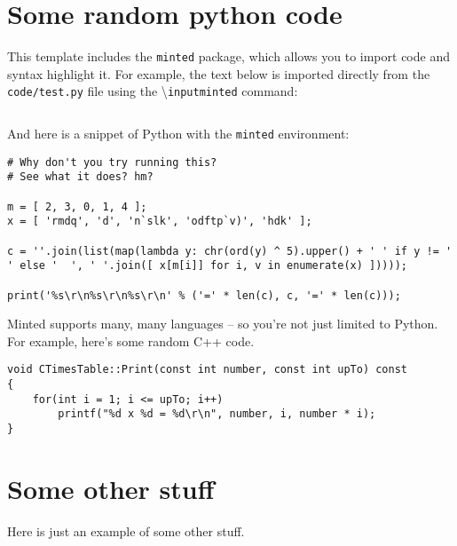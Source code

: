 %
\begin{appendices}


\chapter{Some random python code}
This template includes the \texttt{minted} package, which allows you to import code and syntax highlight it. For example, the text below is imported directly from the \texttt{code/test.py} file using the \textbackslash\texttt{inputminted} command:

\begin{framed}
    \inputminted{python3}{code/test.py}
\end{framed}

And here is a snippet of Python with the \texttt{minted} environment:

\begin{framed}
\begin{verbatim}
# Why don't you try running this?
# See what it does? hm?

m = [ 2, 3, 0, 1, 4 ];
x = [ 'rmdq', 'd', 'n`slk', 'odftp`v)', 'hdk' ];

c = ''.join(list(map(lambda y: chr(ord(y) ^ 5).upper() + ' ' if y != ' ' else '  ', ' '.join([ x[m[i]] for i, v in enumerate(x) ]))));

print('%s\r\n%s\r\n%s\r\n' % ('=' * len(c), c, '=' * len(c)));
\end{verbatim}
\end{framed}

\cleardoublepage
Minted supports many, many languages -- so you're not just limited to Python. For example, here's some random C++ code.

\begin{framed}
\begin{verbatim}
void CTimesTable::Print(const int number, const int upTo) const
{
    for(int i = 1; i <= upTo; i++)
        printf("%d x %d = %d\r\n", number, i, number * i);
}
\end{verbatim}
\end{framed}








\chapter{Some other stuff}
Here is just an example of some other stuff.

\end{appendices}